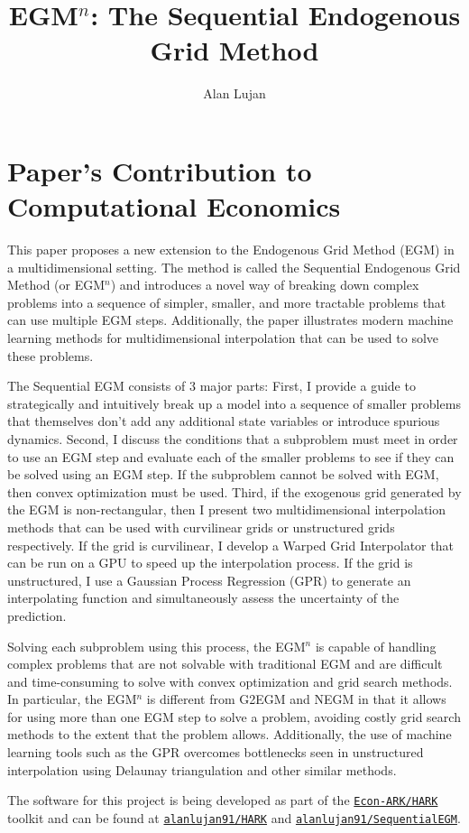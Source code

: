 \documentclass[SequentialEGM]{subfiles}
\title{\Large EGM$^n$: The Sequential Endogenous Grid Method}
\author{Alan Lujan\authNum}
\begin{document}
\maketitle

\begin{authorsinfo}
    \noindent {}
\end{authorsinfo}

\section{Paper's Contribution to Computational Economics}

This paper proposes a new extension to the Endogenous Grid Method (EGM) in a multidimensional setting. The method is called the Sequential Endogenous Grid Method (or EGM$^n$) and introduces a novel way of breaking down complex problems into a sequence of simpler, smaller, and more tractable problems that can use multiple EGM steps. Additionally, the paper illustrates modern machine learning methods for multidimensional interpolation that can be used to solve these problems.

The Sequential EGM consists of 3 major parts: First, I provide a guide to strategically and intuitively break up a model into a sequence of smaller problems that themselves don't add any additional state variables or introduce spurious dynamics. Second, I discuss the conditions that a subproblem must meet in order to use an EGM step and evaluate each of the smaller problems to see if they can be solved using an EGM step. If the subproblem cannot be solved with EGM, then convex optimization must be used. Third, if the exogenous grid generated by the EGM is non-rectangular, then I present two multidimensional interpolation methods that can be used with curvilinear grids or unstructured grids respectively. If the grid is curvilinear, I develop a Warped Grid Interpolator that can be run on a GPU to speed up the interpolation process. If the grid is unstructured, I use a Gaussian Process Regression (GPR) to generate an interpolating function and simultaneously assess the uncertainty of the prediction.

Solving each subproblem using this process, the EGM$^n$ is capable of handling complex problems that are not solvable with traditional EGM and are difficult and time-consuming to solve with convex optimization and grid search methods. In particular, the EGM$^n$ is different from G2EGM and NEGM in that it allows for using more than one EGM step to solve a problem, avoiding costly grid search methods to the extent that the problem allows. Additionally, the use of machine learning tools such as the GPR overcomes bottlenecks seen in unstructured interpolation using Delaunay triangulation and other similar methods.

The software for this project is being developed as part of the \href{https://github.com/econ-ark/HARK}{\texttt{Econ-ARK/HARK}} toolkit and can be found at \href{https://github.com/alanlujan91/HARK/tree/map_coordinates}{\texttt{alanlujan91/HARK}} and \href{https://gitfront.io/r/alanlujan91/DPFn3R7x3Avr/SequentialEGM/}{\texttt{alanlujan91/SequentialEGM}}.
\end{document}
